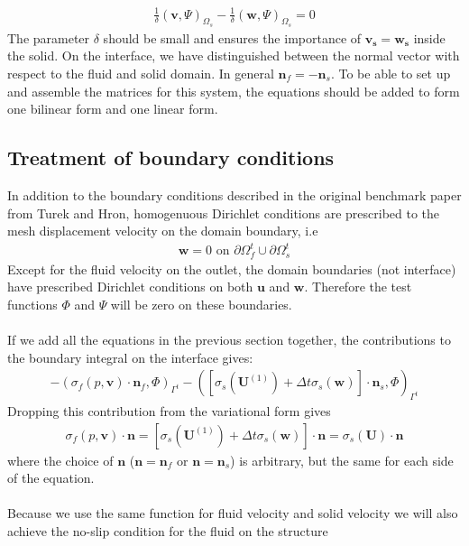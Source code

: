 \begin{align}
\frac{1}{\delta}(\mathbf{v},\Psi)_{\Omega_s} - \frac{1}{\delta}(\mathbf{w},\Psi)_{\Omega_s} = 0 \label{VarMesh2}
\end{align}
The parameter $\delta $ should be small and ensures the importance of $\mathbf{v_s} = \mathbf{w_s}$ inside the solid. On the interface, we have distinguished between the normal vector with respect to the fluid and solid domain. In general $\mathbf{n}_f = -\mathbf{n}_s$. To be able to set up and assemble the matrices for this system, the equations should be added to form one bilinear form and one linear form. 
\subsection{Treatment of boundary conditions}
In addition to the boundary conditions described in the original benchmark paper from Turek and Hron, homogenuous Dirichlet conditions are prescribed to the mesh displacement velocity on the domain boundary, i.e 
\begin{align} 
\mathbf{w} = 0 \text{ on } \partial \Omega_f^t \cup \partial \Omega_s^t
\end{align}
Except for the fluid velocity on the outlet, the domain boundaries (not interface) have prescribed Dirichlet conditions on both $\mathbf{u}$ and $\mathbf{w}$. Therefore the test functions $\Phi$ and $\Psi$ will be zero on these boundaries. \\ \\
If we add all the equations in the previous section together, the contributions to the boundary integral on the interface gives:
\begin{align}- (\sigma_f(p,\mathbf{v}) \cdot \mathbf{n}_f, \Phi)_{\Gamma^t} - ([\sigma_s(\mathbf{U}^{(1)}) + \Delta t \sigma_s(\mathbf{w})]\cdot \mathbf{n}_s, \Phi)_{\Gamma^t}
\end{align}
Dropping this contribution from the variational form gives
\begin{align} \sigma_f(p,\mathbf{v}) \cdot \mathbf{n} = [\sigma_s(\mathbf{U}^{(1)}) + \Delta t \sigma_s(\mathbf{w})] \cdot \mathbf{n} = \sigma_s(\mathbf{U}) \cdot \mathbf{n}
\end{align}
where the choice of $\mathbf{n}$ ($\mathbf{n} = \mathbf{n}_f$ or $\mathbf{n} = \mathbf{n}_s$) is arbitrary, but the same for each side of the equation. \\
\\
Because we use the same function for fluid velocity and solid velocity we will also achieve the no-slip condition for the fluid on the structure
